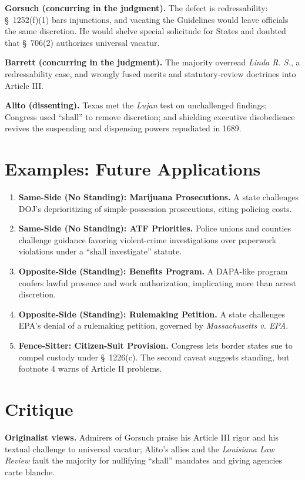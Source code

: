 \documentclass[12pt]{article}
\begin{document}
\textbf{Gorsuch (concurring in the judgment).} The defect is redressability: \S~1252(f)(1) bars injunctions, and vacating the Guidelines would leave officials the same discretion. He would shelve special solicitude for States and doubted that \S~706(2) authorizes universal vacatur.

\textbf{Barrett (concurring in the judgment).} The majority overread \textit{Linda R. S.}, a redressability case, and wrongly fused merits and statutory-review doctrines into Article III.

\textbf{Alito (dissenting).} Texas met the \textit{Lujan} test on unchallenged findings; Congress used ``shall'' to remove discretion; and shielding executive disobedience revives the suspending and dispensing powers repudiated in 1689.

\section{Examples: Future Applications}

\begin{enumerate}
\item \textbf{Same-Side (No Standing): Marijuana Prosecutions.} A state challenges DOJ's deprioritizing of simple-possession prosecutions, citing policing costs.
\item \textbf{Same-Side (No Standing): ATF Priorities.} Police unions and counties challenge guidance favoring violent-crime investigations over paperwork violations under a ``shall investigate'' statute.
\item \textbf{Opposite-Side (Standing): Benefits Program.} A DAPA-like program confers lawful presence and work authorization, implicating more than arrest discretion.
\item \textbf{Opposite-Side (Standing): Rulemaking Petition.} A state challenges EPA's denial of a rulemaking petition, governed by \textit{Massachusetts v. EPA}.
\item \textbf{Fence-Sitter: Citizen-Suit Provision.} Congress lets border states sue to compel custody under \S~1226(c). The second caveat suggests standing, but footnote 4 warns of Article II problems.
\end{enumerate}

\section{Critique}

\textbf{Originalist views.} Admirers of Gorsuch praise his Article III rigor and his textual challenge to universal vacatur; Alito's allies and the \textit{Louisiana Law Review} fault the majority for nullifying ``shall'' mandates and giving agencies carte blanche.
\end{document}
